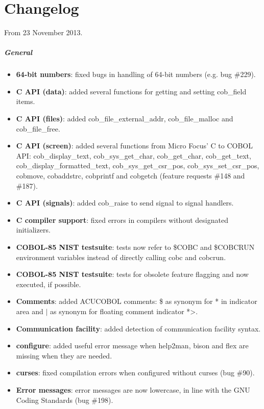 \chapter{Changelog}

From 23 November 2013.

\paragraph{General}
\begin{itemize}
\item \textbf{64-bit numbers}: fixed bugs in handling of 64-bit numbers (e.g. bug \#229).
\item \textbf{C API (data)}: added several functions for getting and setting cob\_field items.
\item \textbf{C API (files)}: added cob\_file\_external\_addr, cob\_file\_malloc and cob\_file\_free.
\item \textbf{C API (screen)}: added several functions from Micro Focus' C to COBOL API: cob\_display\_text, cob\_sys\_get\_char, cob\_get\_char, cob\_get\_text, cob\_display\_formatted\_text, cob\_sys\_get\_csr\_pos, cob\_sys\_set\_csr\_pos, cobmove, cobaddstrc, cobprintf and cobgetch (feature requests \#148 and \#187).
\item \textbf{C API (signals)}: added cob\_raise to send signal to signal handlers.
\item \textbf{C compiler support}: fixed errors in compilers without designated initializers.
\item \textbf{COBOL-85 NIST testsuite}: tests now refer to \$COBC and \$COBCRUN environment variables instead of directly calling cobc and cobcrun.
\item \textbf{COBOL-85 NIST testsuite}: tests for obsolete feature flagging and now executed, if possible.
\item \textbf{Comments}: added ACUCOBOL comments: \$ as synonym for * in indicator area and $\vert$ as synonym for floating comment indicator *>.
\item \textbf{Communication facility}: added detection of communication facility syntax.
\item \textbf{configure}: added useful error message when help2man, bison and flex are missing when they are needed.
\item \textbf{curses}: fixed compilation errors when configured without curses (bug \#90).
\item \textbf{Error messages}: error messages are now lowercase, in line with the GNU Coding Standards (bug \#198).

\end{itemize}
